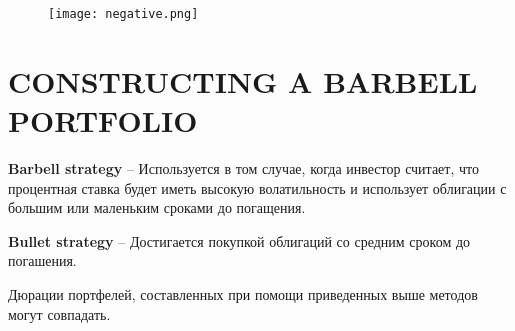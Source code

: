 \documentclass[a4paper,12pt]{article}
\begin{document}
\begin{figure}[h!]
    \texttt{[image: negative.png]}
    \caption{}\label{name1}
\end{figure}

\section{CONSTRUCTING A BARBELL PORTFOLIO}

\textbf{Barbell strategy} -- Используется в том случае, когда инвестор считает, что процентная ставка будет иметь высокую волатильность и использует облигации с большим или маленьким сроками до погащения.

\textbf{Bullet strategy} -- Достигается покупкой облигаций со средним сроком до погашения.

Дюрации портфелей, составленных при помощи приведенных выше методов могут совпадать.
\end{document}
